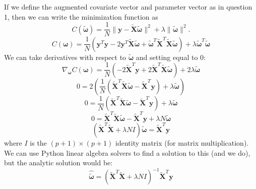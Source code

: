 \documentclass[12pt]{article}
\begin{document}
If we define the augmented covariate vector and parameter vector as in question 1, then we can write the minimization
function as 
\[
C(\tilde{\boldsymbol{\omega}})
= \frac{1}{N}\|\boldsymbol{y} - \tilde{\boldsymbol{X}}\tilde{\boldsymbol{\omega}}\|^2
+ \lambda \|\tilde{\boldsymbol{\omega}}\|^2.
\]
\[
C(\boldsymbol{\omega}) = \frac{1}{N}\left(\boldsymbol{y}^T\boldsymbol{y} - 
2\boldsymbol{y}^T\tilde{\boldsymbol{X}}\tilde{\boldsymbol{\omega}} + 
\tilde{\boldsymbol{\omega}}^T\tilde{\boldsymbol{X}}^T\tilde{\boldsymbol{X}}\tilde{\boldsymbol{\omega}}\right) + 
\lambda\tilde{\boldsymbol{\omega}}^T\tilde{\boldsymbol{\omega}}
\]
We can take derivatives with respect to \(\tilde{\boldsymbol{\omega}}\) and setting equal to 0:
\[
\nabla_{\boldsymbol{\omega}}C(\boldsymbol{\omega}) = \frac{1}{N}\left(
    -2\tilde{\boldsymbol{X}}^T\boldsymbol{y} + 
    2\tilde{\boldsymbol{X}}^T\tilde{\boldsymbol{X}}\tilde{\boldsymbol{\omega}}\right) + 
    2\lambda\tilde{\boldsymbol{\omega}}
\]
\[
0 = 2\left(\frac{1}{N}\left(\tilde{\boldsymbol{X}}^T\tilde{\boldsymbol{X}}\tilde{\boldsymbol{\omega}} - 
\tilde{\boldsymbol{X}}^T\boldsymbol{y}\right) 
+ \lambda\tilde{\boldsymbol{\omega}}\right)
\]
\[
0 = \frac{1}{N}\left(\tilde{\boldsymbol{X}}^T\tilde{\boldsymbol{X}}\tilde{\boldsymbol{\omega}} - 
\tilde{\boldsymbol{X}}^T\boldsymbol{y}\right) 
+ \lambda\tilde{\boldsymbol{\omega}}
\]
\[
0 = \tilde{\boldsymbol{X}}^T\tilde{\boldsymbol{X}}\tilde{\boldsymbol{\omega}} - 
\tilde{\boldsymbol{X}}^T\boldsymbol{y} + \lambda N \tilde{\boldsymbol{\omega}}
\]
\[
\left(\tilde{\boldsymbol{X}}^T\tilde{\boldsymbol{X}} + \lambda N I\right)
\tilde{\boldsymbol{\omega}}
= \tilde{\boldsymbol{X}}^T \boldsymbol{y}
\]
where \(I\) is the \((p+1)\times(p+1)\) identity matrix (for matrix multiplication).  We can use Python 
linear algebra solvers to find a solution to this (and we do), but the analytic solution would be:
\[
\hat{\tilde{\boldsymbol{\omega}}} = 
\left(\tilde{\boldsymbol{X}}^T\tilde{\boldsymbol{X}} + 
\lambda N I\right)^{-1}\tilde{\boldsymbol{X}}^T \boldsymbol{y}\]
\end{document}
